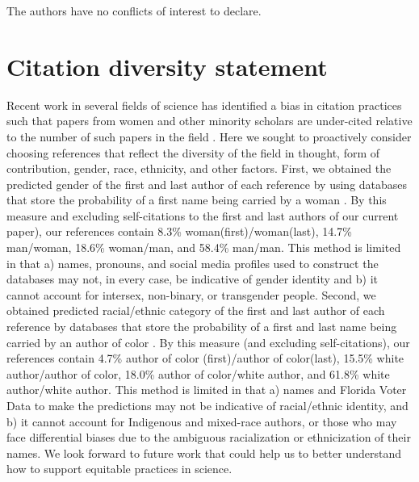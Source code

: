 \documentclass[a4paper,12pt]{article}
\begin{document}
The authors have no conflicts of interest to declare.

\section{Citation diversity statement}

Recent work in several fields of science has identified a bias in citation practices such that papers from women and other minority scholars are under-cited relative to the number of such papers in the field \cite{dworkin2020extent, bertolero2020racial}. Here we sought to proactively consider choosing references that reflect the diversity of the field in thought, form of contribution, gender, race, ethnicity, and other factors. First, we obtained the predicted gender of the first and last author of each reference by using databases that store the probability of a first name being carried by a woman \cite{dworkin2020extent}. By this measure and excluding self-citations to the first and last authors of our current paper), our references contain 8.3\% woman(first)/woman(last), 14.7\% man/woman, 18.6\% woman/man, and 58.4\% man/man. This method is limited in that a) names, pronouns, and social media profiles used to construct the databases may not, in every case, be indicative of gender identity and b) it cannot account for intersex, non-binary, or transgender people. Second, we obtained predicted racial/ethnic category of the first and last author of each reference by databases that store the probability of a first and last name being carried by an author of color \cite{ambekar2009name, sood2018predicting}. By this measure (and excluding self-citations), our references contain 4.7\% author of color (first)/author of color(last), 15.5\% white author/author of color, 18.0\% author of color/white author, and 61.8\% white author/white author. This method is limited in that a) names and Florida Voter Data to make the predictions may not be indicative of racial/ethnic identity, and b) it cannot account for Indigenous and mixed-race authors, or those who may face differential biases due to the ambiguous racialization or ethnicization of their names.  We look forward to future work that could help us to better understand how to support equitable practices in science.

\printbibliography
\end{document}
